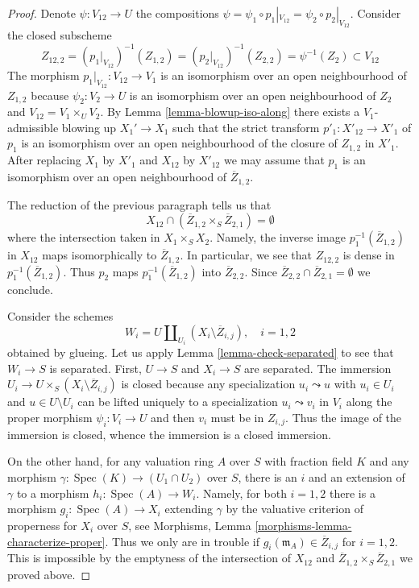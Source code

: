 \documentclass[10pt,a4paper]{amsart}
\theoremstyle{plain}
\theoremstyle{definition}
\theoremstyle{remark}
\numberwithin{equation}{subsection}
\def\Spec{\mathop{\mathrm{Spec}}}
\begin{document}
\begin{proof}
\medskip\noindent
Denote $\psi : V_{12} \to U$ the compositions
$\psi = \psi_1 \circ p_1|_{V_{12}} = \psi_2 \circ p_2|_{V_{12}}$.
Consider the closed subscheme
$$
Z_{12, 2} =
(p_1|_{V_{12}})^{-1}(Z_{1, 2}) =
(p_2|_{V_{12}})^{-1}(Z_{2, 2}) =
\psi^{-1}(Z_2) \subset V_{12}
$$
The morphism $p_1|_{V_{12}} : V_{12} \to V_1$ is an isomorphism
over an open neighbourhood of $Z_{1, 2}$ because $\psi_2 : V_2 \to U$
is an isomorphism over an open neighbourhood of $Z_2$ and
$V_{12} = V_1 \times_U V_2$.
By Lemma \ref{lemma-blowup-iso-along}
there exists a $V_1$-admissible blowing up $X_1' \to X_1$
such that the strict transform $p'_1 : X'_{12} \to X'_1$
of $p_1$ is an isomorphism over an open neighbourhood of
the closure of $Z_{1, 2}$ in $X'_1$.
After replacing $X_1$ by $X'_1$ and $X_{12}$ by $X'_{12}$
we may assume that $p_1$ is an isomorphism over an open
neighbourhood of $\overline{Z}_{1, 2}$.

\medskip\noindent
The reduction of the previous paragraph tells us that
$$
X_{12} \cap (\overline{Z}_{1, 2} \times_S \overline{Z}_{2, 1}) = \emptyset
$$
where the intersection taken in $X_1 \times_S X_2$. Namely, the inverse
image $p_1^{-1}(\overline{Z}_{1, 2})$ in $X_{12}$ maps isomorphically
to $\overline{Z}_{1, 2}$. In particular, we see that $Z_{12, 2}$
is dense in $p_1^{-1}(\overline{Z}_{1, 2})$. Thus $p_2$ maps
$p_1^{-1}(\overline{Z}_{1, 2})$ into $\overline{Z}_{2, 2}$.
Since $\overline{Z}_{2, 2} \cap \overline{Z}_{2, 1} = \emptyset$
we conclude.

\medskip\noindent
Consider the schemes
$$
W_i = U \coprod\nolimits_{U_i} (X_i \setminus \overline{Z}_{i, j}),
\quad i = 1, 2
$$
obtained by glueing. Let us apply Lemma \ref{lemma-check-separated}
to see that $W_i \to S$ is separated. First,
$U \to S$ and $X_i \to S$ are separated. The immersion
$U_i \to U \times_S (X_i \setminus \overline{Z}_{i, j})$
is closed because any specialization $u_i \leadsto u$
with $u_i \in U_i$ and $u \in U \setminus U_i$
can be lifted uniquely to a specialization
$u_i \leadsto v_i$ in $V_i$ along the proper morphism
$\psi_i : V_i \to U$ and then $v_i$ must be in $Z_{i, j}$.
Thus the image of the immersion is closed, whence the immersion
is a closed immersion.

\medskip\noindent
On the other hand, for any valuation ring $A$ over $S$ with fraction field $K$
and any morphism $\gamma : \Spec(K) \to (U_1 \cap U_2)$ over $S$, there
is an $i$ and an extension of $\gamma$ to a morphism $h_i : \Spec(A) \to W_i$.
Namely, for both $i = 1, 2$ there is a morphism
$g_i : \Spec(A) \to X_i$ extending $\gamma$ by the
valuative criterion of properness for $X_i$ over $S$, see
Morphisms, Lemma \ref{morphisms-lemma-characterize-proper}.
Thus we only are in trouble
if $g_i(\mathfrak m_A) \in \overline{Z}_{i, j}$ for $i = 1, 2$. This is
impossible by the emptyness of the intersection of $X_{12}$ and
$\overline{Z}_{1, 2} \times_S \overline{Z}_{2, 1}$ we proved above.


\end{proof}
\end{document}
